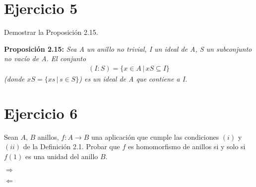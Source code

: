 \documentclass[10pt,a4paper]{article}
\begin{document}
	\section{Ejercicio 5}
	
	Demostrar la Proposición 2.15.
	
	
	\textbf{Proposición 2.15:} \textit{Sea A un anillo no trivial, I un ideal de A, S un subconjunto no vacío de A. El conjunto}
	\begin{gather*}
	\left( I \colon S \right) = \{ x\in A \, \vert \, xS \subseteq I \} 
	\end{gather*}
	\textit{ (donde $ xS = \{ xs \, \vert \, s \in S \} $)	es un ideal de A que contiene a I.}
	
	
	\hfill
	
	
	
	
	
	
	
	\section{Ejercicio 6}
	
	Sean $A,\, B$ anillos, $f:A\rightarrow B$ una aplicación que cumple las condiciones $(i)$ y $(ii)$ de la Definición 2.1. Probar que $f$ es homomorfismo de anillos si y solo si $f(1)$ es una unidad del anillo $B$.
	
	\hfill
	
	$\Rightarrow$
	
	
	\hfill
	
	
	$\Leftarrow$
	
	
	\hfill
	
	
	
\end{document}
